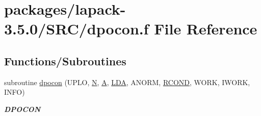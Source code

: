 \hypertarget{dpocon_8f}{}\section{packages/lapack-\/3.5.0/\+S\+R\+C/dpocon.f File Reference}
\label{dpocon_8f}
\subsection*{Functions/\+Subroutines}
\begin{DoxyCompactItemize}
\item 
subroutine \hyperlink{group__doublePOcomputational_ga42c90b8fcfef1a8f7c87a45e8176d643}{dpocon} (U\+P\+L\+O, \hyperlink{polmisc_8c_a0240ac851181b84ac374872dc5434ee4}{N}, \hyperlink{classA}{A}, \hyperlink{example__user_8c_ae946da542ce0db94dced19b2ecefd1aa}{L\+D\+A}, A\+N\+O\+R\+M, \hyperlink{superlu__enum__consts_8h_af00a42ecad444bbda75cde1b64bd7e72a9b5c151728d8512307565994c89919d5}{R\+C\+O\+N\+D}, W\+O\+R\+K, I\+W\+O\+R\+K, I\+N\+F\+O)
\begin{DoxyCompactList}\small\item\em {\bfseries D\+P\+O\+C\+O\+N} \end{DoxyCompactList}\end{DoxyCompactItemize}
